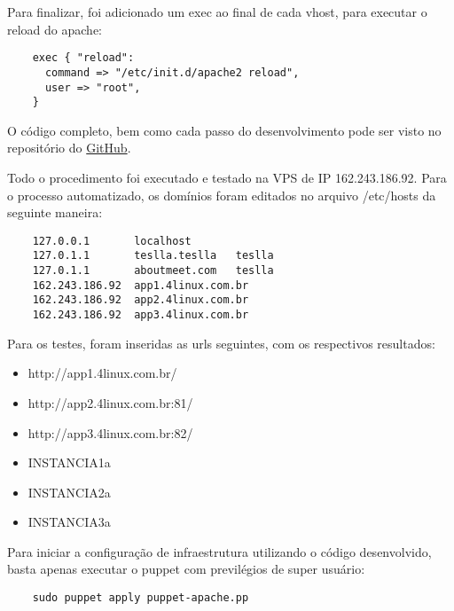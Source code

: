 \documentclass[12pt]{article}
\begin{document}
Para finalizar, foi adicionado um exec ao final de cada vhost, para executar o reload do apache:

\begin{verbatim}
    exec { "reload":
      command => "/etc/init.d/apache2 reload",
      user => "root",
    }
\end{verbatim}


O código completo, bem como cada passo do desenvolvimento pode ser visto no repositório do 
\href{https://github.com/TiagoAssuncao/set-vhost-puppet/}{GitHub}. 

Todo o procedimento foi executado e testado na VPS de IP 162.243.186.92. Para o processo automatizado,
os domínios foram editados no arquivo /etc/hosts da seguinte maneira:

\begin{verbatim}
    127.0.0.1       localhost
    127.0.1.1       teslla.teslla   teslla
    127.0.1.1       aboutmeet.com   teslla
    162.243.186.92  app1.4linux.com.br
    162.243.186.92  app2.4linux.com.br
    162.243.186.92  app3.4linux.com.br
\end{verbatim}

Para os testes, foram inseridas as urls seguintes, com os respectivos resultados:

\begin{itemize}
    \item http://app1.4linux.com.br/
    \item http://app2.4linux.com.br:81/
    \item http://app3.4linux.com.br:82/
\end{itemize}

\begin{itemize}
    \item INSTANCIA1a
    \item INSTANCIA2a
    \item INSTANCIA3a
\end{itemize}

Para iniciar a configuração de infraestrutura utilizando o código desenvolvido, basta apenas
executar o puppet com previlégios de super usuário:

\begin{verbatim}
    sudo puppet apply puppet-apache.pp
\end{verbatim}
\end{document}
